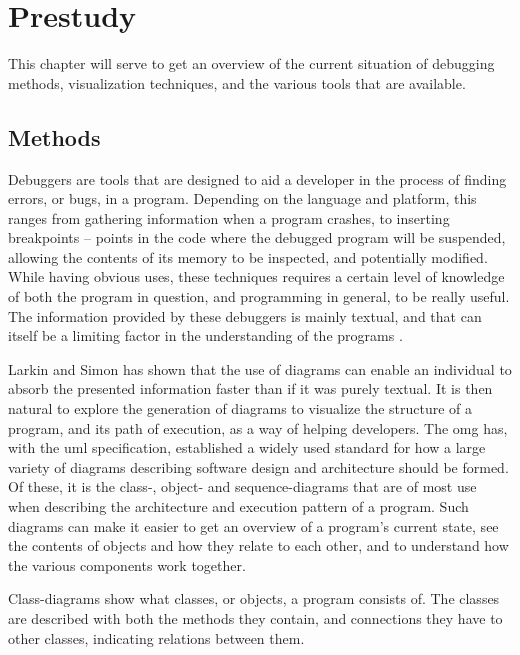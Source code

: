 \chapter{Prestudy}\label{prestudy}%

This chapter will serve to get an overview of the current situation of debugging methods, visualization techniques, and the various tools that are available.

\section{Methods}\label{preMethods}

Debuggers are tools that are designed to aid a developer in the process of finding errors, or bugs, in a program.
Depending on the language and platform, this ranges from gathering information when a program crashes, to inserting \glspl{breakpoint} -- points in the code where the debugged program will be suspended, allowing the contents of its memory to be inspected, and potentially modified.
While having obvious uses, these techniques requires a certain level of knowledge of both the program in question, and programming in general, to be really useful.
The information provided by these debuggers is mainly textual, and that can itself be a limiting factor in the understanding of the programs \cite{Larkin1987}.

Larkin and Simon has shown that the use of diagrams can enable an individual to absorb the presented information faster than if it was purely textual.
It is then natural to explore the generation of diagrams to visualize the structure of a program, and its path of execution, as a way of helping developers.
The \gls{omg} has, with the \gls{uml} specification, established a widely used standard for how a large variety of diagrams describing software design and architecture should be formed.
Of these, it is the class-, object- and sequence-diagrams that are of most use when describing the architecture and execution pattern of a program. %
Such diagrams can make it easier to get an overview of a program's current state, see the contents of objects and how they relate to each other, and to understand how the various components work together.

Class-diagrams show what classes, or objects, a program consists of.
The classes are described with both the methods they contain, and connections they have to other classes, indicating relations between them.

